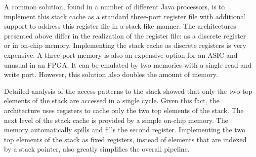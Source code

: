 A common solution, found in a number of different Java processors,
is to implement this stack cache as a standard three-port register
file with additional support to address this register file in a
stack like manner. The architectures presented above differ in the
realization of the register file: as a discrete register or in
on-chip memory. Implementing the stack cache as discrete registers
is very expensive. A three-port memory is also an expensive option
for an ASIC and unusual in an FPGA. It can be emulated by two
memories with a single read and write port. However, this solution
also doubles the amount of memory.

Detailed analysis of the access patterns to the stack showed that
only the two top elements of the stack are accessed in a single
cycle. Given this fact, the architecture uses registers to cache only
the two top elements of the stack. The next level of the stack cache
is provided by a simple on-chip memory. The memory automatically
spills and fills the second register. Implementing the two top
elements of the stack as fixed registers, instead of elements that
are indexed by a stack pointer, also greatly simplifies the overall
pipeline.
